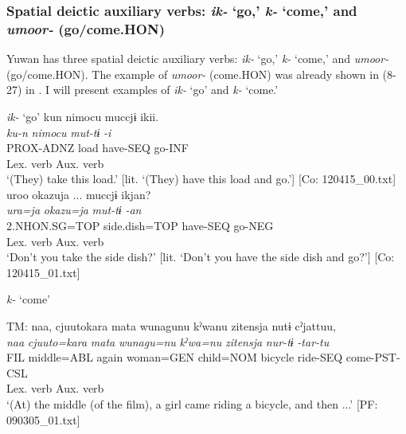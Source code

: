 \subsubsection{Spatial deictic auxiliary verbs: \textit{ik-} ‘go,’ \textit{k-} ‘come,’ and \textit{umoor-} (go/come.HON)}\label{sec:9.1.1.4}

Yuwan has three spatial deictic auxiliary verbs: \textit{ik-} ‘go,’ \textit{k-} ‘come,’ and \textit{umoor-} (go/come.HON). The example of \textit{umoor-} (come.HON) was already shown in (8-27) in . I will present examples of \textit{ik-} ‘go’ and \textit{k-} ‘come.’

\ea  
\exi{}\textit{ik-} ‘go’ \label{ex:9.20}
\ea %
   \gllll   kun  {\textbar}nimocu{\textbar}  muccjɨ  ikii.\\
      \textit{ku-n}  \textit{nimocu}  \textit{mut-tɨ}  \textit{-i}\\
      PROX-ADNZ  load  have-SEQ  go-INF\\
          Lex. verb  Aux. verb\\
      \glt       ‘(They) take this load.’ [lit. ‘(They) have this load and go.’] [Co: 120415\_00.txt]
\ex 
\gllll   uroo  {\textbar}okazu{\textbar}ja  ...  muccjɨ  ikjan?\\
      \textit{ura=ja}  \textit{okazu=ja}    \textit{mut-tɨ}  \textit{-an}\\
      2.NHON.SG=TOP  side.dish=TOP    have-SEQ  go-NEG\\
            Lex. verb  Aux. verb\\
      \glt       ‘Don’t you take the side dish?’ [lit. ‘Don’t you have the side dish and go?’] [Co: 120415\_01.txt]

\exi{} \textit{k-} ‘come’

\ex %
\gllll  TM:  naa,  cjuutokara  mata  wunagunu  kˀwanu  {\textbar}zitensja{\textbar} nutɨ  cˀjattuu,\\
      \textit{naa}  \textit{cjuuto=kara}  \textit{mata}  \textit{wunagu=nu}  \textit{kˀwa=nu}  \textit{zitensja}  \textit{nur-tɨ}  \textit{-tar-tu}\\
      FIL  middle=ABL  again  woman=GEN  child=NOM  bicycle    ride-SEQ  come-PST-CSL\\
                                                             Lex. verb  Aux. verb\\
      \glt       ‘(At) the middle (of the film), a girl came riding a bicycle, and then ...’ [PF: 090305\_01.txt]

